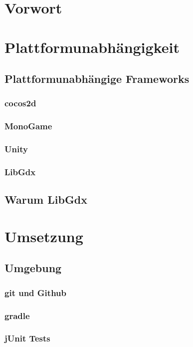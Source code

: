 \section{Vorwort}
\section{Plattformunabhängigkeit}
	\subsection{Plattformunabhängige Frameworks}
		\subsubsection{cocos2d}
		\subsubsection{MonoGame}
		\subsubsection{Unity}
		\subsubsection{LibGdx}
	\subsection{Warum LibGdx}
\section{Umsetzung}
	\subsection{Umgebung}
		\subsubsection{git und Github}
		\subsubsection{gradle}
		\subsubsection{jUnit Tests}

